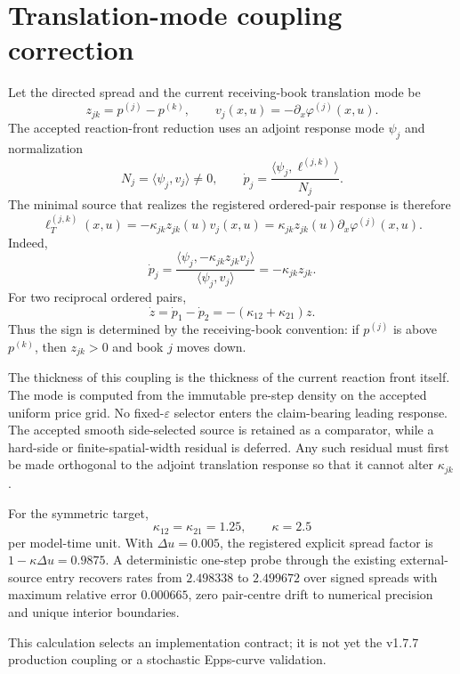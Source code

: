 
\section*{Translation-mode coupling correction}

Let the directed spread and the current receiving-book translation mode be
\[
  z_{jk}=p^{(j)}-p^{(k)},
  \qquad
  v_j(x,u)=-\partial_x\varphi^{(j)}(x,u).
\]
The accepted reaction-front reduction uses an adjoint response mode $\psi_j$
and normalization
\[
  N_j=\langle\psi_j,v_j\rangle\ne0,
  \qquad
  \dot p_j
  =\frac{\langle\psi_j,\ell^{(j,k)}\rangle}{N_j}.
\]
The minimal source that realizes the registered ordered-pair response is
therefore
\[
  \ell_T^{(j,k)}(x,u)
  =-\kappa_{jk}z_{jk}(u)v_j(x,u)
  =\kappa_{jk}z_{jk}(u)\partial_x\varphi^{(j)}(x,u).
\]
Indeed,
\[
  \dot p_j
  =\frac{\langle\psi_j,-\kappa_{jk}z_{jk}v_j\rangle}
  {\langle\psi_j,v_j\rangle}
  =-\kappa_{jk}z_{jk}.
\]
For two reciprocal ordered pairs,
\[
  \dot z
  =\dot p_1-\dot p_2
  =-(\kappa_{12}+\kappa_{21})z.
\]
Thus the sign is determined by the receiving-book convention: if $p^{(j)}$ is
above $p^{(k)}$, then $z_{jk}>0$ and book $j$ moves down.

The thickness of this coupling is the thickness of the current reaction front
itself.  The mode is computed from the immutable pre-step density on the
accepted uniform price grid.  No fixed-$\varepsilon$ selector enters the
claim-bearing leading response.  The accepted smooth side-selected source is
retained as a comparator, while a hard-side or finite-spatial-width residual is
deferred.  Any such residual must first be made orthogonal to the adjoint
translation response so that it cannot alter $\kappa_{jk}$.

For the symmetric target,
\[
  \kappa_{12}=\kappa_{21}=1.25,
  \qquad
  \kappa=2.5
\]
per model-time unit. With $\Delta u=0.005$, the registered explicit spread
factor is $1-\kappa\Delta u=0.9875$. A deterministic one-step probe through the
existing external-source entry recovers rates from $2.498338$ to $2.499672$
over signed spreads with maximum relative error $0.000665$, zero pair-centre
drift to numerical precision and unique interior boundaries.

This calculation selects an implementation contract; it is not yet the
v1.7.7 production coupling or a stochastic Epps-curve validation.
